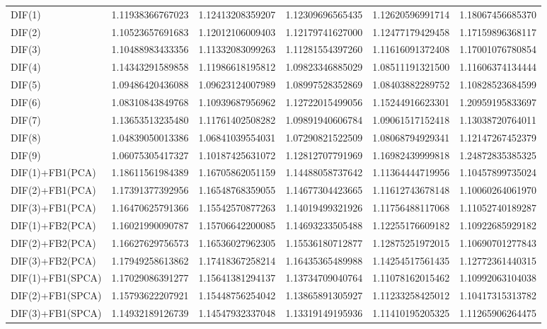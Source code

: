 \begin{table}[h]
\begin{adjustbox}{totalheight=\baselineskip}
\begin{tabular}{lSSSSS}
DIF(1) & 1.11938366767023 & 1.12413208359207 & 1.12309696565435 & 1.12620596991714 & 1.18067456685370 \\ 
DIF(2) & 1.10523657691683 & 1.12012106009403 & 1.12179741627000 & 1.12477179429458 & 1.17159896368117 \\ 
DIF(3) & 1.10488983433356 & 1.11332083099263 & 1.11281554397260 & 1.11616091372408 & 1.17001076780854 \\ 
DIF(4) & 1.14343291589858 & 1.11986618195812 & 1.09823346885029 & 1.08511191321500 & 1.11606374134444 \\ 
DIF(5) & 1.09486420436088 & 1.09623124007989 & 1.08997528352869 & 1.08403882289752 & 1.10828523684599 \\ 
DIF(6) & 1.08310843849768 & 1.10939687956962 & 1.12722015499056 & 1.15244916623301 & 1.20959195833697 \\ 
DIF(7) & 1.13653513235480 & 1.11761402508282 & 1.09891940606784 & 1.09061517152418 & 1.13038720764011 \\ 
DIF(8) & 1.04839050013386 & 1.06841039554031 & 1.07290821522509 & 1.08068794929341 & 1.12147267452379 \\ 
DIF(9) & 1.06075305417327 & 1.10187425631072 & 1.12812707791969 & 1.16982439999818 & 1.24872835385325 \\ 
DIF(1)+FB1(PCA) & 1.18611561984389 & 1.16705862051159 & 1.14488058737642 & 1.11364444719956 & 1.10457899735024 \\ 
DIF(2)+FB1(PCA) & 1.17391377392956 & 1.16548768359055 & 1.14677304423665 & 1.11612743678148 & 1.10060264061970 \\ 
DIF(3)+FB1(PCA) & 1.16470625791366 & 1.15542570877263 & 1.14019499321926 & 1.11756488117068 & 1.11052740189287 \\ 
DIF(1)+FB2(PCA) & 1.16021990090787 & 1.15706642200085 & 1.14693233505488 & 1.12255176609182 & 1.10922685929182 \\ 
DIF(2)+FB2(PCA) & 1.16627629756573 & 1.16536027962305 & 1.15536180712877 & 1.12875251972015 & 1.10690701277843 \\ 
DIF(3)+FB2(PCA) & 1.17949258613862 & 1.17418367258214 & 1.16435365489988 & 1.14254517561435 & 1.12772361440315 \\ 
DIF(1)+FB1(SPCA) & 1.17029086391277 & 1.15641381294137 & 1.13734709040764 & 1.11078162015462 & 1.10992063104038 \\ 
DIF(2)+FB1(SPCA) & 1.15793622207921 & 1.15448756254042 & 1.13865891305927 & 1.11233258425012 & 1.10417315313782 \\ 
DIF(3)+FB1(SPCA) & 1.14932189126739 & 1.14547932337048 & 1.13319149195936 & 1.11410195205325 & 1.11265906264475 \\ 

\end{tabular}
\end{adjustbox}
\end{table}

